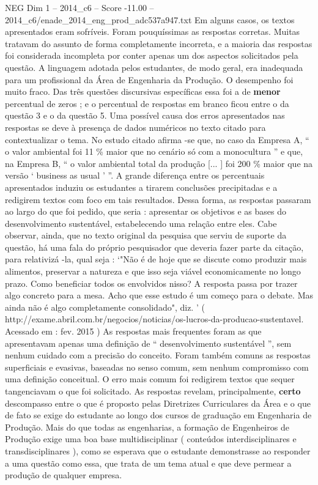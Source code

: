 \begin{textsample}{NEG Dim 1 – 2014\_c6 – Score -11.00 – 2014\_c6/enade\_2014\_eng\_prod\_adc537a947.txt}
Em alguns casos, os textos apresentados eram sofríveis.
Foram pouquíssimas as respostas corretas.
Muitas tratavam do assunto de forma completamente incorreta, e a maioria das respostas foi considerada incompleta por conter apenas um dos aspectos solicitados pela questão.
A linguagem adotada pelos estudantes, de modo geral, era inadequada para um profissional da Área de Engenharia da Produção.
O desempenho foi muito fraco.
Das três questões discursivas específicas essa foi a de \textbf{menor} percentual de zeros ; e o percentual de respostas em branco ficou entre o da questão 3 e o da questão 5.
Uma possível causa dos erros apresentados nas respostas se deve à presença de dados numéricos no texto citado para contextualizar o tema.
No estudo citado afirma -se que, no caso da Empresa A, “ o valor ambiental foi 11 \% maior que no cenário só com a monocultura ” e que, na Empresa B, “ o valor ambiental total da produção [... ] foi 200 \% maior que na versão ‘ business as usual ’ ”.
A grande diferença entre os percentuais apresentados induziu os estudantes a tirarem conclusões precipitadas e a redigirem textos com foco em tais resultados.
Dessa forma, as respostas passaram ao largo do que foi pedido, que seria : apresentar os objetivos e as bases do desenvolvimento sustentável, estabelecendo uma relação entre eles.
Cabe observar, ainda, que no texto original da pesquisa que serviu de suporte da questão, há uma fala do próprio pesquisador que deveria fazer parte da citação, para relativizá -la, qual seja : ‘"Não é de hoje que se discute como produzir mais alimentos, preservar a natureza e que isso seja viável economicamente no longo prazo.
Como beneficiar todos os envolvidos nisso?
A resposta passa por trazer algo concreto para a mesa.
Acho que esse estudo é um começo para o debate.
Mas ainda não é algo completamente consolidado", diz. ’ ( http://exame.abril.com.br/negocios/noticias/os-lucros-da-producao-sustentavel.
Acessado em : fev. 2015 ) As respostas mais frequentes foram as que apresentavam apenas uma definição de “ desenvolvimento sustentável ”, sem nenhum cuidado com a precisão do conceito.
Foram também comuns as respostas superficiais e evasivas, baseadas no senso comum, sem nenhum compromisso com uma definição conceitual.
O erro mais comum foi redigirem textos que sequer tangenciavam o que foi solicitado.
As respostas revelam, principalmente, \textbf{certo} descompasso entre o que é proposto pelas Diretrizes Curriculares da Área e o que de fato se exige do estudante ao longo dos cursos de graduação em Engenharia de Produção.
Mais do que todas as engenharias, a formação de Engenheiros de Produção exige uma boa base multidisciplinar ( conteúdos interdisciplinares e transdisciplinares ), como se esperava que o estudante demonstrasse ao responder a uma questão como essa, que trata de um tema atual e que deve permear a produção de qualquer empresa.

\end{textsample}
